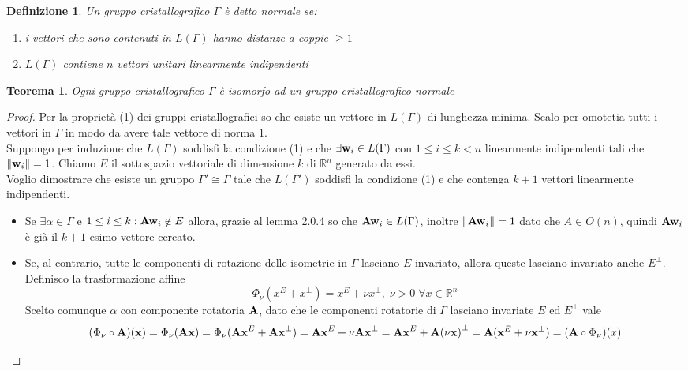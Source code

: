 \documentclass[12pt,a4paper]{book}
\newtheorem{definition}{Definizione}[section]
\newtheorem{theorem}{Teorema}[section]
\begin{document}
\begin{definition}
Un gruppo cristallografico $\Gamma$ è detto normale se:
\begin{enumerate}
\item i vettori che sono contenuti in $L(\Gamma)$ hanno distanze a coppie $\geq 1$
\item $L(\Gamma)$ contiene $n$ vettori unitari linearmente indipendenti
\end{enumerate}
\end{definition}

\begin{theorem}
Ogni gruppo cristallografico $\Gamma$ è isomorfo ad un gruppo cristallografico normale
\end{theorem}

\begin{proof}
Per la proprietà (1) dei gruppi cristallografici so che esiste un vettore in $L(\Gamma)$ di lunghezza minima. Scalo per omotetia tutti i vettori in $\Gamma$ in modo da avere tale vettore di norma $1$. \\
Suppongo per induzione che $L(\Gamma)$ soddisfi la condizione (1) e che $\exists \vb{w}_i \in L(\Gamma)$ con $1 \leq i \leq k < n $ linearmente indipendenti tali che $\norm{\vb{w}_i} = 1 $.  
Chiamo $E$ il sottospazio vettoriale di dimensione $k$ di $\mathbb{R}^n$ generato da essi.\\
Voglio dimostrare che esiste un gruppo $\Gamma ' \cong \Gamma$ tale che $L(\Gamma')$ soddisfi la condizione (1) e che contenga $k+1$ vettori linearmente indipendenti. \\
\begin{itemize}
\item Se $\exists \alpha \in \Gamma $ e $1 \leq i \leq k: \vb{Aw}_i \notin E$ allora, grazie al lemma 2.0.4 so che $\vb{Aw}_i \in L(\Gamma)$, inoltre $\norm{\vb{Aw}_i} = 1$ dato che $A \in O(n)$, quindi $\vb{Aw}_i$ è già il $k+1$-esimo vettore cercato.
\item Se, al contrario, tutte le componenti di rotazione delle isometrie in $\Gamma$ lasciano $E$ invariato, allora queste lasciano invariato anche $E^{\perp}$. \\
Definisco la trasformazione affine 
\[ \Phi_{\nu} (x^E + x^{\perp} )=  x^E + \nu x^{\perp} , \; \nu > 0  \; \forall x \in \mathbb{R}^n\]
Scelto comunque $\alpha$ con componente rotatoria $\vb{A}$, dato che le componenti rotatorie di $\Gamma$ lasciano invariate $E$ ed $E^{\perp}$ vale
\[ ( \Phi_{\nu}  \circ \vb{A})(\vb{x}) = \Phi_{\nu} (\vb{Ax})  = \Phi_{\nu} (\vb{Ax}^E +\vb{Ax }^{\perp})  = \vb{Ax}^E +\nu \vb{Ax }^{\perp} = \vb{Ax}^E +\vb{A(\nu x) }^{\perp} = \vb{A} ( \vb{x}^E +\nu \vb{x }^{\perp})  = ( \vb{A} \circ \Phi_{\nu} ) (x)\]

\end{itemize}
\end{proof}
\end{document}
